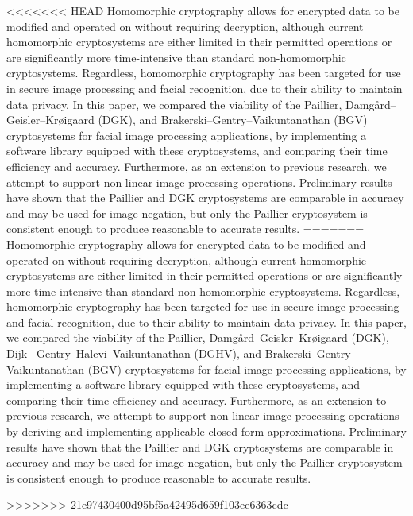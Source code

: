 \begin{thesisabstract}
    \noindent
<<<<<<< HEAD
    Homomorphic cryptography allows for encrypted data to be modified and operated on without requiring decryption, although current homomorphic cryptosystems are either limited in their permitted operations or are significantly more time-intensive than standard non-homomorphic cryptosystems. Regardless, homomorphic cryptography has been targeted for use in secure image processing and facial recognition, due to their ability to maintain data privacy. In this paper, we compared the viability of the Paillier, Damg{\aa}rd--Geisler--Kr{\o}igaard (DGK), and Brakerski--Gentry--Vaikuntanathan (BGV) cryptosystems for facial image processing applications, by implementing a software library equipped with these cryptosystems, and comparing their time efficiency and accuracy. Furthermore, as an extension to previous research, we attempt to support non-linear image processing operations. Preliminary results have shown that the Paillier and DGK cryptosystems are comparable in accuracy and may be used for image negation, but only the Paillier cryptosystem is consistent enough to produce reasonable to accurate results.
=======
    Homomorphic cryptography allows for encrypted data to be modified and operated on without requiring decryption, although current homomorphic cryptosystems are either limited in their permitted operations or are significantly more time-intensive than standard non-homomorphic cryptosystems. Regardless, homomorphic cryptography has been targeted for use in secure image processing and facial recognition, due to their ability to maintain data privacy. In this paper, we compared the viability of the Paillier, Damg{\aa}rd--Geisler--Kr{\o}igaard (DGK), Dijk-- Gentry--Halevi--Vaikuntanathan (DGHV), and Brakerski--Gentry--Vaikuntanathan (BGV) cryptosystems for facial image processing applications, by implementing a software library equipped with these cryptosystems, and comparing their time efficiency and accuracy. Furthermore, as an extension to previous research, we attempt to support non-linear image processing operations by deriving and implementing applicable closed-form approximations. Preliminary results have shown that the Paillier and DGK cryptosystems are comparable in accuracy and may be used for image negation, but only the Paillier cryptosystem is consistent enough to produce reasonable to accurate results.

>>>>>>> 21e97430400d95bf5a42495d659f103ee6363cdc
\end{thesisabstract}

